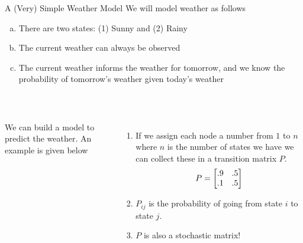 \documentclass[xcoler=dvipsnames, aspectratio=169]{beamer}
\begin{document}
    \begin{frame}{A (Very) Simple Weather Model}
        \footnotesize
        We will model weather as follows
        \begin{enumerate}[a)]
            \pause\item There are two states: (1) Sunny and (2) Rainy
            \pause\item The current weather can always be observed
            \pause\item The current weather informs the weather for tomorrow, and we know the probability
                of tomorrow's weather given today's weather
        \end{enumerate}\pause\
        \vspace{10pt}
        \begin{columns}
            We can build a model to predict the weather. An example is given below\pause\\
            \begin{center}
            \end{center}
            \begin{enumerate}
                \pause\item If we assign each node a number from $1$ to $n$ where $n$ is 
                    the number of states we have we can collect these in a transition matrix $P$.\pause\
                    \[
                        P = \begin{bmatrix}
                            .9 & .5 \\
                            .1 & .5
                        \end{bmatrix}
                    \]
                    \vspace{-12pt}
                \pause\item $P_{ij}$ is the probability of going from state $i$ to state $j$.
                \pause\item $P$ is also a stochastic matrix!
            \end{enumerate}
        \end{columns}
    \end{frame}
\end{document}
